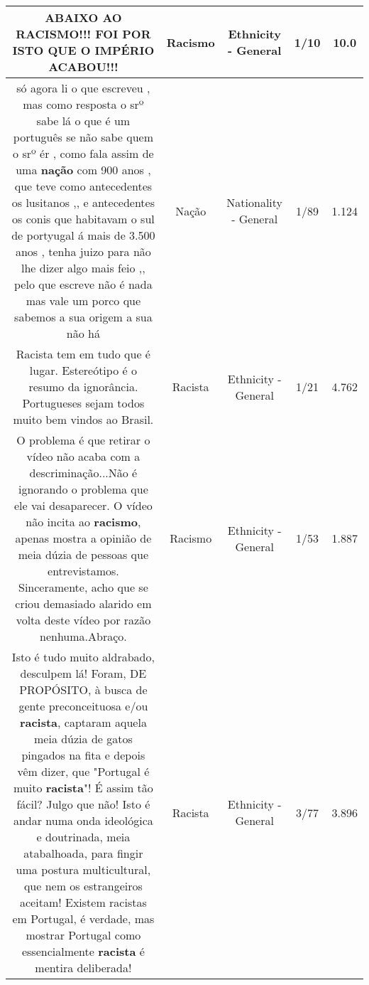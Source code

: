\documentclass[11pt]{article}
\newlength\mylength
\begin{document}
\begin{center}
\begin{longtable}{|C{.65\mylength}|C{.30\mylength}|C{.12\mylength}|C{.12\mylength}|C{.12\mylength}|}
  \small ABAIXO AO \textbf{RACISMO}!!! FOI POR ISTO QUE O IMPÉRIO ACABOU!!!\normalsize   & Racismo & Ethnicity - General & 1/10 & 10.0 \\  \hline
  \small só agora  li o que escreveu , mas  como resposta   o srº  sabe  lá  o que é  um português  se  não  sabe  quem  o srº  ér   ,  como fala assim de uma  \textbf{nação}  com   900 anos   , que  teve  como antecedentes os  lusitanos  ,,  e  antecedentes  os   conis que   habitavam o sul de  portyugal  á  mais de  3.500 anos  , tenha   juizo  para  não   lhe  dizer  algo mais   feio ,,  pelo que escreve   não  é  nada   mas    vale  um  porco  que  sabemos  a sua  origem  a sua   não  há\normalsize   & Nação & Nationality - General & 1/89 & 1.124 \\  \hline
  \small Racista tem em tudo que é lugar. Estereótipo é o resumo da ignorância. Portugueses sejam todos muito bem vindos ao Brasil.\normalsize   & Racista & Ethnicity - General & 1/21 & 4.762 \\  \hline
  \small O problema é que retirar o vídeo não acaba com a descriminação...Não é ignorando o problema que ele vai desaparecer. O vídeo não incita ao \textbf{racismo}, apenas mostra a opinião de meia dúzia de pessoas que entrevistamos. Sinceramente, acho que se criou demasiado alarido em volta deste vídeo por razão nenhuma.Abraço.\normalsize   & Racismo & Ethnicity - General & 1/53 & 1.887 \\  \hline
  \small Isto é tudo muito aldrabado, desculpem lá! Foram, DE PROPÓSITO, à busca de gente preconceituosa e/ou \textbf{racista}, captaram aquela meia dúzia de gatos pingados na fita e depois vêm dizer, que "Portugal é muito \textbf{racista}"! É assim tão fácil? Julgo que não! Isto é andar numa onda ideológica e doutrinada, meia atabalhoada, para fingir uma postura multicultural, que nem os estrangeiros aceitam! Existem racistas em Portugal, é verdade, mas mostrar Portugal como essencialmente \textbf{racista} é mentira deliberada!\normalsize   & Racista & Ethnicity - General & 3/77 & 3.896 \\  \hline

\end{longtable}
\end{center}
\end{document}
